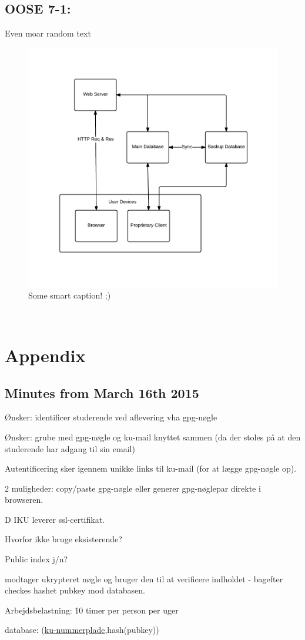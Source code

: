 \documentclass[11pt,a4paper]{article}
\let\OldItem\item
\newcommand{\SubItemStart}[1]{%
    \let\item\SubItemEnd
    \begin{SubItemList}[resume]%
        \OldItem #1%
}
\newcommand{\SubItemMiddle}[1]{%
    \OldItem #1%
}
\newcommand{\SubItemEnd}[1]{%
    \end{SubItemList}%
    \let\item\OldItem
    \item #1%
}
\newcommand*{\SubItem}[1]{%
    \let\SubItem\SubItemMiddle%
    \SubItemStart{#1}%
}%
\begin{document}
\subsection{OOSE 7-1:}
Even moar random text \\
\begin{figure}[h!]
    \centering
    \includegraphics[width=1.1\textwidth]{pictures/oose7_1}
    \caption{Some smart caption! ;)}
    \label{fig:OOSE71}
\end{figure}
\\


\section{Appendix}
\subsection{Minutes from March 16th 2015}
\begin{itemize}
\item Ønsker: identificer studerende ved aflevering vha gpg-nøgle
\item Ønsker: grube med gpg-nøgle og ku-mail knyttet sammen (da der stoles på at den studerende har adgang til sin email)
\item Autentificering sker igennem unikke links til ku-mail (for at lægge gpg-nøgle op).
\SubItem 2 muligheder: copy/paste gpg-nøgle eller generer gpg-nøglepar direkte i browseren.
\item DIKU leverer ssl-certifikat.
\item Hvorfor ikke bruge eksisterende?
\item Public index j/n?
\item modtager ukrypteret nøgle og bruger den til at verificere indholdet - bagefter checkes hashet pubkey mod databasen.
\item Arbejdsbelastning: 10 timer per person per uger
\item database: (\underline{ku-nummerplade},hash(pubkey))
\end{itemize}
\end{document}
